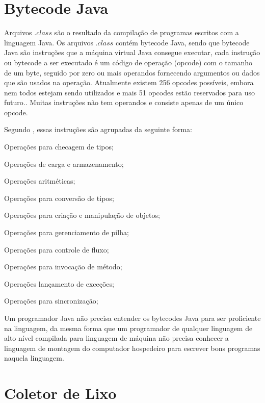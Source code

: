   \section{Bytecode Java}

  Arquivos $.class$ são o resultado da compilação de programas escritos com a linguagem Java. Os arquivos $.class$ contém bytecode Java, sendo que bytecode Java são instruções que a máquina virtual Java consegue executar, cada instrução ou bytecode a ser executado é um código de operação (\ac{opcode}) com o tamanho de um byte, seguido por zero ou mais operandos fornecendo argumentos ou dados que são usados na operação. Atualmente existem 256 opcodes possíveis, embora nem todos estejam sendo utilizados e mais 51 opcodes estão reservados para uso futuro.\cite{jvm:2013}. Muitas instruções não tem operandos e consiste apenas de um único \ac{opcode}.

  Segundo , essas instruções são agrupadas da seguinte forma:

  \begin{compactitem}
    \item Operações para checagem de tipos;
    \item Operações de carga e armazenamento;
    \item Operações aritméticas;
    \item Operações para conversão de tipos;
    \item Operações para criação e manipulação de objetos;
    \item Operações para gerenciamento de pilha;
    \item Operações para controle de fluxo;
    \item Operações para invocação de método;
    \item Operações lançamento de exceções;
    \item Operações para sincronização;
  \end{compactitem}

  Um programador Java não precisa entender os bytecodes Java para ser proficiente na linguagem, da mesma forma que um programador de qualquer linguagem de alto nível compilada para linguagem de máquina não precisa conhecer a linguagem de montagem do computador hospedeiro para escrever bons programas naquela linguagem.

  \section{Coletor de Lixo}

